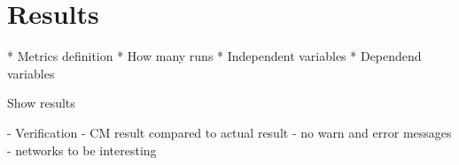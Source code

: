 \section{Results}

* Metrics definition
* How many runs
  * Independent variables
  * Dependend variables
  
Show results

  - Verification 
  - CM result compared to actual result
  - no warn and error messages
  - networks to be interesting
